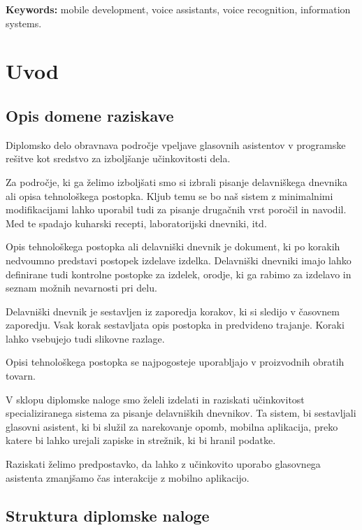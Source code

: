 \documentclass[a4paper, 12pt]{book}
\newcommand{\tkeywordsEn}{mobile development, voice assistants, voice recognition, information systems}
\newcommand{\clearemptydoublepage}{\newpage{\pagestyle{empty}\cleardoublepage}}
\begin{document}
\bigskip

\noindent\textbf{Keywords:} \tkeywordsEn.
\clearemptydoublepage

\mainmatter
\setcounter{page}{1}
\pagestyle{fancy}

\chapter{Uvod}
\section{Opis domene raziskave}

Diplomsko delo obravnava področje vpeljave glasovnih asistentov v programske rešitve kot sredstvo za izboljšanje učinkovitosti dela.

Za področje, ki ga želimo izboljšati smo si izbrali pisanje delavniškega dnevnika ali opisa tehnološkega postopka.
Kljub temu se bo naš sistem z minimalnimi modifikacijami lahko uporabil tudi za pisanje drugačnih vrst poročil in navodil.
Med te spadajo kuharski recepti, laboratorijski dnevniki, itd.

Opis tehnološkega postopka ali delavniški dnevnik je dokument, ki po korakih nedvoumno predstavi postopek izdelave izdelka.
Delavniški dnevniki imajo lahko definirane tudi kontrolne postopke za izdelek, orodje, ki ga rabimo za izdelavo in seznam možnih nevarnosti pri delu.

Delavniški dnevnik je sestavljen iz zaporedja korakov, ki si sledijo v časovnem zaporedju.
Vsak korak sestavljata opis postopka in predvideno trajanje.
Koraki lahko vsebujejo tudi slikovne razlage.

Opisi tehnološkega postopka se najpogosteje uporabljajo v proizvodnih obratih tovarn.

V sklopu diplomske naloge smo želeli izdelati in raziskati učinkovitost specializiranega sistema za pisanje delavniških dnevnikov.
Ta sistem, bi sestavljali glasovni asistent, ki bi služil za narekovanje opomb, mobilna aplikacija, preko katere bi lahko urejali zapiske in strežnik, ki bi hranil podatke.

Raziskati želimo predpostavko, da lahko z učinkovito uporabo glasovnega asistenta zmanjšamo čas interakcije z mobilno aplikacijo.


\section{Struktura diplomske naloge}
\end{document}
